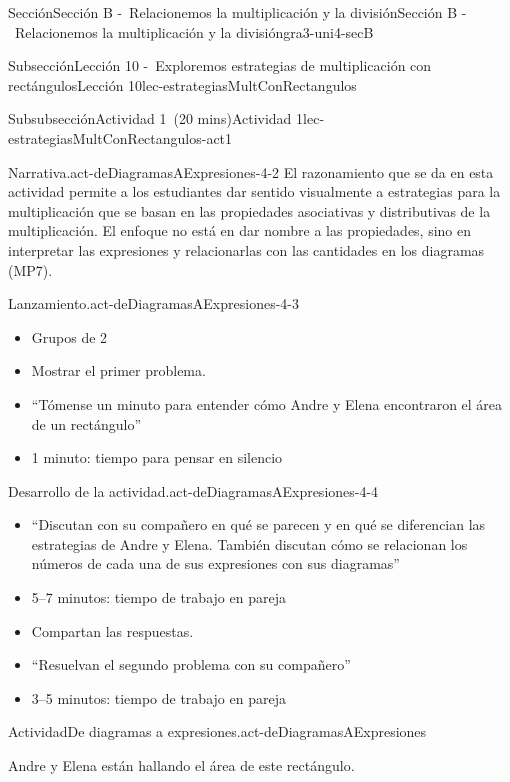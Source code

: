 \documentclass[oneside,10pt,]{article}
\begin{document}
\begin{sectionptx}{Sección}{Sección B -~Relacionemos la multiplicación y la división}{}{Sección B -~Relacionemos la multiplicación y la división}{}{}{gra3-uni4-secB}
\begin{subsectionptx}{Subsección}{Lección 10 -~Exploremos estrategias de multiplicación con rectángulos}{}{Lección 10}{}{}{lec-estrategiasMultConRectangulos}
\begin{subsubsectionptx}{Subsubsección}{Actividad 1~(20 mins)}{}{Actividad 1}{}{}{lec-estrategiasMultConRectangulos-act1}
\begin{paragraphs}{Narrativa.}{act-deDiagramasAExpresiones-4-2}
El razonamiento que se da en esta actividad permite a los estudiantes dar sentido visualmente a estrategias para la multiplicación que se basan en las propiedades asociativas y distributivas de la multiplicación. El enfoque no está en dar nombre a las propiedades, sino en interpretar las expresiones y relacionarlas con las cantidades en los diagramas (MP7).%
\end{paragraphs}%
\begin{paragraphs}{Lanzamiento.}{act-deDiagramasAExpresiones-4-3}%
%
\begin{itemize}[label=\textbullet]
\item{}Grupos de 2%
\item{}Mostrar el primer problema.%
\item{}``Tómense un minuto para entender cómo Andre y Elena encontraron el área de un rectángulo''%
\item{}1 minuto: tiempo para pensar en silencio%
\end{itemize}
\end{paragraphs}%
\begin{paragraphs}{Desarrollo de la actividad.}{act-deDiagramasAExpresiones-4-4}%
%
\begin{itemize}[label=\textbullet]
\item{}``Discutan con su compañero en qué se parecen y en qué se diferencian las estrategias de Andre y Elena. También discutan cómo se relacionan los números de cada una de sus expresiones con sus diagramas''%
\item{}5–7 minutos: tiempo de trabajo en pareja%
\item{}Compartan las respuestas.%
\item{}``Resuelvan el segundo problema con su compañero''%
\item{}3–5 minutos: tiempo de trabajo en pareja%
\end{itemize}
\end{paragraphs}%
\begin{activity}{Actividad}{De diagramas a expresiones.}{act-deDiagramasAExpresiones}%
\begin{sidebyside}{2}{0.025}{0.025}{0.05}%
\begin{sbspanel}{0.4}%
Andre y Elena están hallando el área de este rectángulo.%
\end{sbspanel}%
\begin{sbspanel}{0.5}%

\end{sbspanel}
\end{sidebyside}
\end{activity}
\end{subsubsectionptx}
\end{subsectionptx}
\end{sectionptx}
\end{document}
